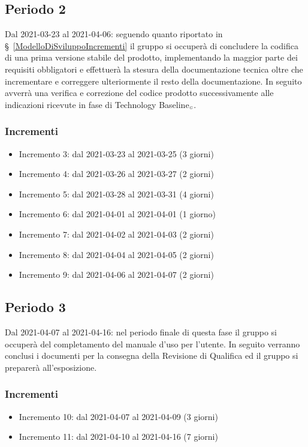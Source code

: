 \subsection{Periodo 2}\label{PianificazioneProgettazioneDettaglioPeriodo2}
Dal 2021-03-23 al 2021-04-06: seguendo quanto riportato in \S~\ref{ModelloDiSviluppoIncrementi} il gruppo si occuperà di concludere la codifica di una prima versione stabile del prodotto, implementando la maggior parte dei requisiti obbligatori e effettuerà la stesura della documentazione tecnica oltre che incrementare e correggere ulteriormente il resto della documentazione. In seguito avverrà una verifica e correzione del codice prodotto successivamente alle indicazioni ricevute in fase di Technology Baseline$_{\scaleto{G}{3pt}}$.
\subsubsection{Incrementi}\label{PianificazioneProgettazioneDettaglioPeriodo2Incrementi}
\begin{itemize}
	\item Incremento 3: dal 2021-03-23 al 2021-03-25 (3 giorni)
	\item Incremento 4: dal 2021-03-26 al 2021-03-27 (2 giorni)
	\item Incremento 5: dal 2021-03-28 al 2021-03-31 (4 giorni)
	\item Incremento 6: dal 2021-04-01 al 2021-04-01 (1 giorno)
	\item Incremento 7: dal 2021-04-02 al 2021-04-03 (2 giorni)
	\item Incremento 8: dal 2021-04-04 al 2021-04-05 (2 giorni)
	\item Incremento 9: dal 2021-04-06 al 2021-04-07 (2 giorni)
\end{itemize}
\subsection{Periodo 3}\label{PianificazioneProgettazioneDettaglioPeriodo3}
Dal 2021-04-07 al 2021-04-16: nel periodo finale di questa fase il gruppo si occuperà del completamento del manuale d'uso per l'utente. In seguito verranno conclusi i documenti per la consegna della Revisione di Qualifica ed il gruppo si preparerà all'esposizione.
\subsubsection{Incrementi}\label{PianificazioneProgettazioneDettaglioPeriodo3Incrementi}
\begin{itemize}
	\item Incremento 10: dal 2021-04-07 al 2021-04-09 (3 giorni)
	\item Incremento 11: dal 2021-04-10 al 2021-04-16 (7 giorni)
\end{itemize}
\clearpage
